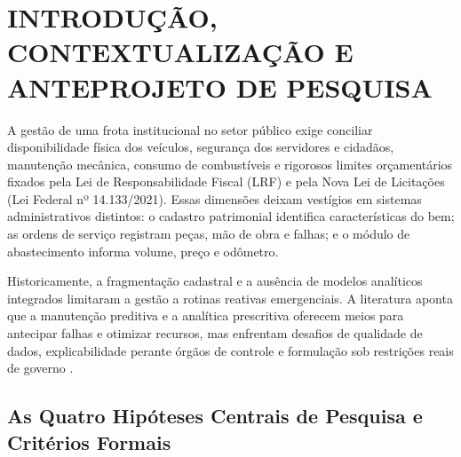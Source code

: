 \chapter{INTRODUÇÃO, CONTEXTUALIZAÇÃO E ANTEPROJETO DE PESQUISA}
\label{cap:introducao}

A gestão de uma frota institucional no setor público exige conciliar disponibilidade física dos veículos, segurança dos servidores e cidadãos, manutenção mecânica, consumo de combustíveis e rigorosos limites orçamentários fixados pela Lei de Responsabilidade Fiscal (LRF) e pela Nova Lei de Licitações (Lei Federal nº 14.133/2021). Essas dimensões deixam vestígios em sistemas administrativos distintos: o cadastro patrimonial identifica características do bem; as ordens de serviço registram peças, mão de obra e falhas; e o módulo de abastecimento informa volume, preço e odômetro.

Historicamente, a fragmentação cadastral e a ausência de modelos analíticos integrados limitaram a gestão a rotinas reativas emergenciais. A literatura aponta que a manutenção preditiva e a analítica prescritiva oferecem meios para antecipar falhas e otimizar recursos, mas enfrentam desafios de qualidade de dados, explicabilidade perante órgãos de controle e formulação sob restrições reais de governo \cite{mahale2025}.

\section{As Quatro Hipóteses Centrais de Pesquisa e Critérios Formais}

